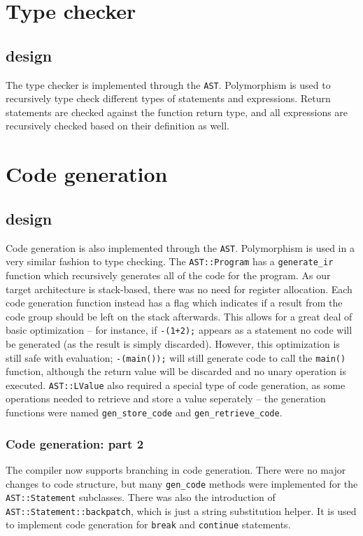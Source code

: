 \documentclass{article}
\begin{document}
\section{Type checker}
\subsection{design}
The type checker is implemented through the \texttt{AST}. Polymorphism is used to recursively type check different types of statements and expressions.
Return statements are checked against the function return type, and all expressions are recursively checked based on their definition as well.
\section{Code generation}
\subsection{design}
Code generation is also implemented through the \texttt{AST}. Polymorphism is used in a very similar fashion to type checking.
The \texttt{AST::Program} has a \texttt{generate\_ir} function which recursively generates all of the code for the program.
As our target architecture is stack-based, there was no need for register allocation. Each code generation function instead has a flag which indicates if a result from the code group should be left on the stack afterwards.
This allows for a great deal of basic optimization -- for instance, if \texttt{-(1+2);} appears as a statement no code will be generated (as the result is simply discarded).
However, this optimization is still safe with evaluation; \texttt{-(main());} will still generate code to call the \texttt{main()} function, although the return value will be discarded and no unary operation is executed.
\texttt{AST::LValue} also required a special type of code generation, as some operations needed to retrieve and store a value seperately -- the generation functions were named \texttt{gen\_store\_code} and \texttt{gen\_retrieve\_code}. \\
\subsubsection{Code generation: part 2}
The compiler now supports branching in code generation. There were no major changes to code structure, but many \texttt{gen\_code} methods were implemented for the \texttt{AST::Statement} subclasses. There was also the introduction of \texttt{AST::Statement::backpatch}, which is just a string substitution helper. It is used to implement code generation for \texttt{break} and \texttt{continue} statements.
\end{document}
